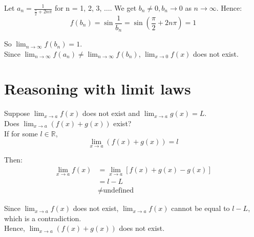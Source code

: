 \documentclass[11pt]{article}
\begin{document}
Let \(a_n = \frac{1}{\frac{\pi}{2} + 2n\pi}\) for n = 1, 2, 3, \(\ldots\). We get \(b_n \neq 0, b_n \rightarrow 0\) as \(n \rightarrow \infty\). Hence:
\[f(b_n) = \sin \frac{1}{b_n} = \sin \left( \frac{\pi}{2} + 2n\pi \right) = 1\]

So \(\lim_{n \rightarrow \infty} f(b_n) = 1\).
\\[0pt]

Since \(\lim_{n \rightarrow \infty} f(a_n) \neq \lim_{n \rightarrow \infty} f(b_n)\), \(\lim_{x \rightarrow 0} f(x)\) does not exist.

\section{Reasoning with limit laws}
\label{sec:org2a8a680}
Suppose \(\lim_{x \rightarrow a} f(x)\) does not exist and \(\lim_{x \rightarrow a} g(x) = L\).
\\[0pt]

Does \(\lim_{x \rightarrow a} (f(x) + g(x))\) exist?
\\[0pt]

If for some \(l \in \mathbb{R}\),
\[\lim_{x \rightarrow a} (f(x) + g(x)) = l\]

Then:
\begin{align*}
\lim_{x \rightarrow a} f(x) &= \lim_{x \rightarrow a}[f(x) + g(x) - g(x)] \\
&= l - L \\
&\neq \text{undefined}
\end{align*}

Since \(\lim_{x \rightarrow a} f(x)\) does not exist, \(\lim_{x \rightarrow a} f(x)\) cannot be equal to \(l - L\), which is a contradiction.
\\[0pt]

Hence, \(\lim_{x \rightarrow a} (f(x) + g(x))\) does not exist.
\end{document}
